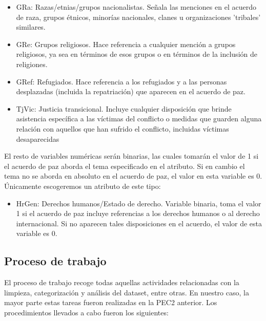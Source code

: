 \documentclass[11pt]{article}
\begin{document}
\begin{itemize}
\item
  GRa: Razas/etnias/grupos nacionalistas. Señala las menciones en el
  acuerdo de raza, grupos étnicos, minorías nacionales, clanes u
  organizaciones 'tribales' similares.
\item
  GRe: Grupos religiosos. Hace referencia a cualquier mención a grupos
  religiosos, ya sea en términos de esos grupos o en términos de la
  inclusión de religiones. ~
\item
  GRef: Refugiados. Hace referencia a los refugiados y a las personas
  desplazadas (incluida la repatriación) que aparecen en el acuerdo de
  paz.
\item
  TjVic: Justicia transicional. Incluye cualquier disposición que brinde
  asistencia específica a las víctimas del conflicto o medidas que guarden alguna relación con aquellos que han sufrido el conflicto, incluidas víctimas desaparecidas
\end{itemize}

El resto de variables numéricas serán binarias, las cuales tomarán
el valor de 1 si el acuerdo de paz aborda el tema especificado en el
atributo. Si en cambio el tema no se aborda en absoluto en el acuerdo
de paz, el valor en esta variable es 0. Únicamente escogeremos un atributo de este tipo:

\begin{itemize}
\item
  HrGen: Derechos humanos/Estado de derecho. Variable binaria, toma el
  valor 1 si el acuerdo de paz incluye referencias a los derechos
  humanos o al derecho internacional. Si no aparecen tales disposiciones
  en el acuerdo, el valor de esta variable es 0.
\end{itemize}

\subsection{Proceso de trabajo}

El proceso de trabajo recoge todas aquellas actividades relacionadas con la limpieza, categorización y análisis del dataset, entre otras. En nuestro caso, la mayor parte estas tareas fueron realizadas en la PEC2 anterior. Los procedimientos llevados a cabo fueron los siguientes:
\end{document}
